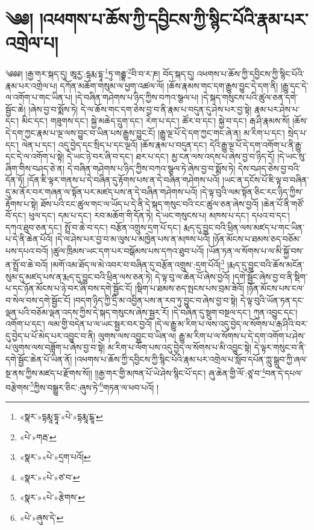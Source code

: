 \chapter{༄༅། །འཕགས་པ་ཆོས་ཀྱི་དབྱིངས་ཀྱི་སྙིང་པོའི་རྣམ་པར་འགྲེལ་པ།}༄༅༅། །རྒྱ་གར་སྐད་དུ། ཨཱརྱ་:དྷརྨ་དྷཱ་\footnote{«སྣར་»དྷརྨཱ་དྷཱ་«པེ་»དྷརྨཱ་ངྒཱ་}ཏུ་གརྦྷ་\footnote{«པེ་»གརྦ་}བི་བ་ར་ཎ། བོད་སྐད་དུ། འཕགས་པ་ཆོས་ཀྱི་དབྱིངས་ཀྱི་སྙིང་པོའི་རྣམ་པར་འགྲེལ་པ། དཀོན་མཆོག་གསུམ་ལ་ཕྱག་འཚལ་ལོ། །ཆོས་རྣམས་གང་དག་རྒྱུས་བྱུང་དེ་དག་ནི། །རྒྱུ་དང་དེ་ལ་འགོག་པ་གང་ཡིན་པ། །དེ་བཞིན་གཤེགས་པ་ཉིད་ཀྱིས་བཀའ་སྩལ་པ། །དེ་སྐད་གསུངས་པའི་ཚུལ་ཅན་དགེ་སྦྱོང་ཆེ། །ཞེས་བྱ་བ་སྨོས་ཏེ། དེ་ལ་ཆོས་གང་དག་ཅེས་བྱ་བ་ནི་རྣམ་པ་བདུན་དུ་ཤེས་པར་བྱ་སྟེ། རྣམ་པར་ཤེས་པ་དང་། མིང་དང་། གཟུགས་དང་། སྐྱེ་མཆེད་དྲུག་དང་། རེག་པ་དང་། ཚོར་བ་དང་། སྐྱེ་བ་དང་། རྒ་ཤི་རྣམས་སོ། །ཆོས་དེ་དག་ཀྱང་རྣམ་པ་ལྔ་ལས་བྱུང་བ་ཡིན་པས་རྒྱུས་བྱུང་ངོ། །རྒྱུ་ལྔ་པོ་དེ་དག་ཀྱང་གང་ཞེ་ན། མ་རིག་པ་དང་། སྲེད་པ་དང་། ལེན་པ་དང་། འདུ་བྱེད་དང་སྲིད་པ་དང་ལྔའོ། །ཆོས་རྣམ་པ་བདུན་དང་། དེའི་རྒྱུ་ལྔ་པོ་དེ་དག་འགོག་པ་ནི་རྒྱུ་དང་དེ་ལ་འགོག་པ་སྟེ། དེ་ཡང་ཉེ་བར་ཞི་བ་དང་། ཐར་པ་དང་། མྱ་ངན་ལས་འདས་པ་ཞེས་བྱ་བ་ཉིད་དོ། །དེ་ཡང་སུ་ཞིག་གིས་བཤད་ཅེ་ན། དེ་བཞིན་གཤེགས་པ་ཉིད་ཀྱིས་བཀའ་སྩལ་ཏེ་ཞེས་བྱ་བ་སྨོས་ཏེ། དེས་བཤད་ཅེས་བྱ་བའི་དོན་ཏོ། །དོན་ཇི་ལྟར་གནས་པ་དེ་བཞིན་དུ་རྟོགས་པས་ན་དེ་བཞིན་གཤེགས་པའོ། །ཡང་ན་དངོས་པོ་ཇི་ལྟ་བ་བཞིན་དུ་མ་ནོར་བར་གཞན་ལ་སྟོན་པར་མཛད་པས་ན་དེ་བཞིན་གཤེགས་པའོ། །དེ་ལྟ་བུའི་ལམ་སྟོན་ཅིང་རང་ཉིད་ཀྱིས་རྟོགས་པ་སྟེ། ཐོས་པའི་ངང་ཚུལ་གང་ལ་ཡོད་པ་དེ་ནི་དེ་སྐད་གསུང་བའི་ངང་ཚུལ་ཅན་ཞེས་བྱའོ། །ཆེན་པོ་ནི་གཙོ་བོ་དང་། ཕུལ་དང་། དམ་པ་དང་། རབ་མཆོག་གི་དོན་ཏེ། དེ་ཡང་གསུངས་པ། མཁས་པ་དང་། དཔའ་བ་དང་། དཀའ་ཐུབ་ཅན་དང་། སྤྲོ་བ་ཆེ་བ་དང་། བརྩོན་འགྲུས་དྲག་པོ་དང་། རྨད་དུ་བྱུང་བའི་ཕྲིན་ལས་མཛད་པ་གང་ཡིན་པ་དེ་ནི་ཆེན་པོའོ། །དེ་ལ་ཤེས་པར་བྱ་བ་མ་ལུས་པ་མཁྱེན་པས་ན་མཁས་པའོ། །ཉོན་མོངས་པ་ཐམས་ཅད་བཅོམ་པས་དཔའ་བའོ། །ཚུལ་ཁྲིམས་ཡང་དག་པར་བསྒོམས་པས་དཀའ་ཐུབ་པའོ། །ཡོན་ཏན་ལ་སོགས་པ་ལ་མི་སྐྱོ་བས་ན་སྤྲོ་བ་ཆེ་བའོ། །མགོ་འམ་ཐོད་ལ་མེ་འབར་བ་བཞིན་དུ་བརྩོན་འགྲུས་:དྲག་པོའོ།\footnote{«སྣར་»«པེ་»དྲག་པའོ།} །རྨད་དུ་བྱུང་བའི་ཆོས་མངོན་སུམ་དུ་མཛད་པས་ན་རྨད་དུ་བྱུང་བའི་ཕྲིན་ལས་ཅན་ཏེ། དེ་ལྟ་བུ་ལ་ཆེན་པོ་ཞེས་བྱའོ། །དགེ་སྦྱོང་ཞེས་བྱ་བ་ནི་སྡིག་པ་དང་ཉོན་མོངས་པ་ཉེ་བར་ཞི་བས་དགེ་སྦྱོང་ངོ། །སྡིག་པ་ཐམས་ཅད་སྤངས་པས་བྲམ་ཟེའོ། །ཉོན་མོངས་པས་ངལ་བ་སེལ་བས་དགེ་སྦྱོང་ངོ། །བདག་ཉིད་ཀྱི་དྲི་མ་འབྱིན་པས་ན་རབ་ཏུ་བྱུང་བ་ཞེས་བྱ་བ་སྟེ། དེ་ལྟ་བུའི་ཡོན་ཏན་དང་ལྡན་པའི་བཅོམ་ལྡན་འདས་ཀྱིས་དེ་སྐད་གསུངས་ཞེས་སྦྱར་རོ། །དེ་བཞིན་དུ་སྡུག་བསྔལ་དང་། ཀུན་འབྱུང་དང་། འགོག་པ་དང་། ལམ་གྱི་བདེན་པ་ལ་ཡང་སྦྱར་བར་བྱའོ། །དེ་ལ་རྒྱུ་མ་རིག་པ་ལས་འདུ་བྱེད་ལ་སོགས་པ་རྒ་ཤིའི་བར་དུ་བྱེད་པ་པོ་མེད་པར་འབྱུང་བ་ནི། ལུགས་ལས་འབྱུང་བ་ཡིན་ལ། རྒྱུ་མ་རིག་པ་ལ་སོགས་པ་དེ་དག་འགོག་པ་ཤེས་པ་ལུགས་ལས་བཟློག་པ་ཞེས་བྱ་བ་སྟེ། མ་རིག་པ་ལོག་པས་འདུ་བྱེད་ལ་སོགས་པ་མི་འབྱུང་སྟེ། དེ་ལྟར་གསུང་བ་ནི་དགེ་སྦྱོང་ཆེན་པོ་ཡིན་ནོ། །འཕགས་པ་ཆོས་ཀྱི་དབྱིངས་ཀྱི་སྙིང་པོའི་རྣམ་པར་འགྲེལ་པ་སློབ་དཔོན་ཀླུ་སྒྲུབ་ཀྱི་ཞལ་སྔ་ནས་ཀྱིས་མཛད་པ་རྫོགས་སོ།། །།རྒྱ་གར་གྱི་མཁན་པོ་ཡེ་ཤེས་སྙིང་པོ་དང་། ཞུ་ཆེན་གྱི་ལོ་:ཙཱ་བ་\footnote{«སྣར་»«པེ་»ཙ་བ་}བན་དེ་དཔལ་བརྩེགས་\footnote{«སྣར་»«པེ་»རྩེགས་}ཀྱིས་བསྒྱུར་ཅིང་:ཞུས་ཏེ་\footnote{«པེ་»ཞུས་དེ་}གཏན་ལ་ཕབ་པའོ། ། 